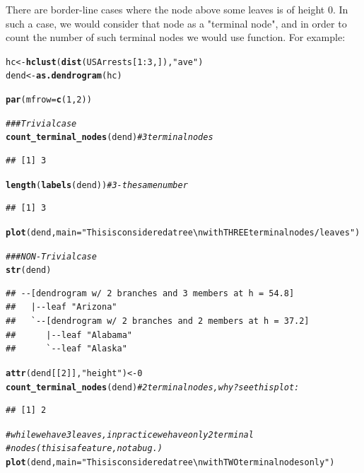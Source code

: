 \documentclass[shortnames,nojss,article]{jss}\usepackage[]{graphicx}\usepackage[]{color}
\makeatletter
\newcommand{\hlnum}[1]{\textcolor[rgb]{0.686,0.059,0.569}{#1}}%
\newcommand{\hlstr}[1]{\textcolor[rgb]{0.192,0.494,0.8}{#1}}%
\newcommand{\hlcom}[1]{\textcolor[rgb]{0.678,0.584,0.686}{\textit{#1}}}%
\newcommand{\hlopt}[1]{\textcolor[rgb]{0,0,0}{#1}}%
\newcommand{\hlstd}[1]{\textcolor[rgb]{0.345,0.345,0.345}{#1}}%
\newcommand{\hlkwb}[1]{\textcolor[rgb]{0.69,0.353,0.396}{#1}}%
\newcommand{\hlkwc}[1]{\textcolor[rgb]{0.333,0.667,0.333}{#1}}%
\newcommand{\hlkwd}[1]{\textcolor[rgb]{0.737,0.353,0.396}{\textbf{#1}}}%
\newenvironment{kframe}{%
 \def\at@end@of@kframe{}%
 \ifinner\ifhmode%
  \def\at@end@of@kframe{\end{minipage}}%
  \begin{minipage}{\columnwidth}%
 \fi\fi%
 \def\FrameCommand##1{\hskip\@totalleftmargin \hskip-\fboxsep
 \colorbox{shadecolor}{##1}\hskip-\fboxsep
     \hskip-\linewidth \hskip-\@totalleftmargin \hskip\columnwidth}%
 \MakeFramed {\advance\hsize-\width
   \@totalleftmargin\z@ \linewidth\hsize
   \@setminipage}}%
 {\par\unskip\endMakeFramed%
 \at@end@of@kframe}
\newenvironment{knitrout}{}{} %
\makeatother
\begin{document}
There are border-line cases where the node above some leaves is of height 0. In such a case, we would consider that node as a "terminal node", and in order to count the number of such terminal nodes we would use  function. For example:

\begin{knitrout}
\color{fgcolor}\begin{kframe}
\begin{alltt}
\hlstd{hc} \hlkwb{<-} \hlkwd{hclust}\hlstd{(}\hlkwd{dist}\hlstd{(USArrests[}\hlnum{1}\hlopt{:}\hlnum{3}\hlstd{, ]),} \hlstr{"ave"}\hlstd{)}
\hlstd{dend} \hlkwb{<-} \hlkwd{as.dendrogram}\hlstd{(hc}\hlstd{)}

\hlkwd{par}\hlstd{(}\hlkwc{mfrow} \hlstd{=} \hlkwd{c}\hlstd{(}\hlnum{1}\hlstd{,} \hlnum{2}\hlstd{)}\hlstd{)}

\hlcom{### Trivial case}
\hlkwd{count_terminal_nodes}\hlstd{(dend)}  \hlcom{# 3 terminal nodes}
\end{alltt}
\begin{verbatim}
## [1] 3
\end{verbatim}
\begin{alltt}
\hlkwd{length}\hlstd{(}\hlkwd{labels}\hlstd{(dend))}  \hlcom{# 3 - the same number}
\end{alltt}
\begin{verbatim}
## [1] 3
\end{verbatim}
\begin{alltt}
\hlkwd{plot}\hlstd{(dend,} \hlkwc{main} \hlstd{=} \hlstr{"This is considered a tree \textbackslash{}n with THREE terminal nodes/leaves"}\hlstd{)}

\hlcom{### NON-Trivial case}
\hlkwd{str}\hlstd{(dend)}
\end{alltt}
\begin{verbatim}
## --[dendrogram w/ 2 branches and 3 members at h = 54.8]
##   |--leaf "Arizona" 
##   `--[dendrogram w/ 2 branches and 2 members at h = 37.2]
##      |--leaf "Alabama" 
##      `--leaf "Alaska"
\end{verbatim}
\begin{alltt}
\hlkwd{attr}\hlstd{(dend[[}\hlnum{2}\hlstd{]],} \hlstr{"height"}\hlstd{)} \hlkwb{<-} \hlnum{0}
\hlkwd{count_terminal_nodes}\hlstd{(dend)}  \hlcom{# 2 terminal nodes, why? see this plot:}
\end{alltt}
\begin{verbatim}
## [1] 2
\end{verbatim}
\begin{alltt}
\hlcom{# while we have 3 leaves, in practice we have only 2 terminal}
\hlcom{# nodes (this is a feature, not a bug.)}
\hlkwd{plot}\hlstd{(dend,} \hlkwc{main} \hlstd{=} \hlstr{"This is considered a tree \textbackslash{}n with TWO terminal nodes only"}\hlstd{)}
\end{alltt}
\end{kframe}


\end{knitrout}
\end{document}
